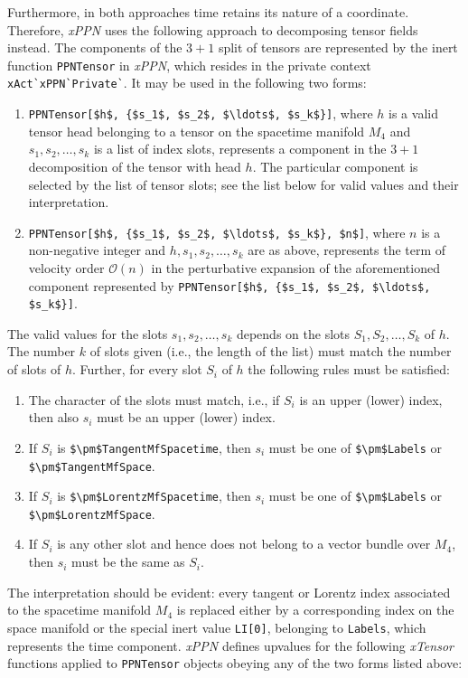 \documentclass[notitlepage,a4paper,aps,prd,onecolumn,superscriptaddress,nofootinbib,groupedaddress,longbibliography]{revtex4-1}
\newcommand{\xPPN}{\emph{xPPN}}
\newcommand{\xTensor}{\emph{xTensor}}
\begin{document}
Furthermore, in both approaches time retains its nature of a coordinate. Therefore, \xPPN{} uses the following approach to decomposing tensor fields instead. The components of the $3+1$ split of tensors are represented by the inert function \lstinline/PPNTensor/ in \xPPN, which resides in the private context \lstinline/xAct`xPPN`Private`/. It may be used in the following two forms:
\begin{enumerate}
\item
\lstinline/PPNTensor[$h$, {$s_1$, $s_2$, $\ldots$, $s_k$}]/, where \(h\) is a valid tensor head belonging to a tensor on the spacetime manifold \(M_4\) and \(s_1, s_2, \ldots, s_k\) is a list of index slots, represents a component in the $3+1$ decomposition of the tensor with head \(h\). The particular component is selected by the list of tensor slots; see the list below for valid values and their interpretation.
\item
\lstinline/PPNTensor[$h$, {$s_1$, $s_2$, $\ldots$, $s_k$}, $n$]/, where \(n\) is a non-negative integer and \(h, s_1, s_2, \ldots, s_k\) are as above, represents the term of velocity order \(\mathcal{O}(n)\) in the perturbative expansion of the aforementioned component represented by \lstinline/PPNTensor[$h$, {$s_1$, $s_2$, $\ldots$, $s_k$}]/.
\end{enumerate}
The valid values for the slots \(s_1, s_2, \ldots, s_k\) depends on the slots \(S_1, S_2, \ldots, S_k\) of \(h\). The number $k$ of slots given (i.e., the length of the list) must match the number of slots of \(h\). Further, for every slot \(S_i\) of \(h\) the following rules must be satisfied:
\begin{enumerate}
\item
The character of the slots must match, i.e., if \(S_i\) is an upper (lower) index, then also \(s_i\) must be an upper (lower) index.
\item
If \(S_i\) is \lstinline/$\pm$TangentMfSpacetime/, then \(s_i\) must be one of \lstinline/$\pm$Labels/ or \lstinline/$\pm$TangentMfSpace/.
\item
If \(S_i\) is \lstinline/$\pm$LorentzMfSpacetime/, then \(s_i\) must be one of \lstinline/$\pm$Labels/ or \lstinline/$\pm$LorentzMfSpace/.
\item
If \(S_i\) is any other slot and hence does not belong to a vector bundle over \(M_4\), then \(s_i\) must be the same as \(S_i\).
\end{enumerate}
The interpretation should be evident: every tangent or Lorentz index associated to the spacetime manifold \(M_4\) is replaced either by a corresponding index on the space manifold or the special inert value \lstinline/LI[0]/, belonging to \lstinline/Labels/, which represents the time component. \xPPN{} defines upvalues for the following \xTensor{} functions applied to \lstinline/PPNTensor/ objects obeying any of the two forms listed above:
\end{document}
